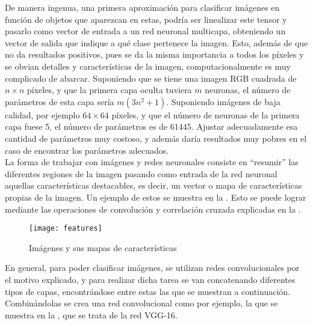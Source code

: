			De manera ingenua, una primera aproximación para clasificar imágenes en función de objetos que aparezcan en estas, podría ser linealizar este tensor y pasarlo como vector de entrada a un red neuronal multicapa, obteniendo un vector de salida que indique a qué clase pertenece la imagen. Esto, además de que no da resultados positivos, pues se da la misma importancia a todos los píxeles y se obvian detalles y características de la imagen, computacionalmente es muy complicado de abarcar. Suponiendo que se tiene una imagen RGB cuadrada de $n \times n$ píxeles, y que la primera capa oculta tuviera $m$ neuronas, el número de parámetros de esta capa sería $m(3n^2 + 1)$. Suponiendo imágenes de baja calidad, por ejemplo $64 \times 64$ píxeles, y que el número de neuronas de la primera capa fuese 5, el número de parámetros es de 61445. Ajustar adecuadamente esa cantidad de parámetros muy costoso, y además daría resultados muy pobres en el caso de encontrar los parámetros adecuados. \\
			
			La forma de trabajar con imágenes y redes neuronales consiste en ``resumir'' las diferentes regiones de la imagen pasando como entrada de la red neuronal aquellas características destacables, es decir, un vector o mapa de características propias de la imagen. Un ejemplo de estos se muestra en la . Esto se puede lograr mediante las operaciones de convolución y correlación cruzada explicadas en la . 
			
			\begin{figure}[!h]
				\centering
				\texttt{[image: features]}
				\caption{Imágenes y sus mapas de características\cite{features}}
				\label{fig:features}
			\end{figure}
			
			En general, para poder clasificar imágenes, se utilizan redes convolucionales por el motivo explicado, y para realizar dicha tarea se van concatenando diferentes tipos de capas, encontrándose entre estas las que se muestran a continuación\cite{introCNN}. Combinándolas se crea una red convolucional como por ejemplo, la que se muestra en la , que se trata de la red VGG-16. 
			
